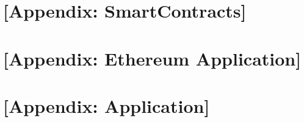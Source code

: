 

\setcounter{chapter}{0}
\renewcommand\thechapter{\Alph{chapter}}

\captionsetup[table]{list=no}
\captionsetup[figure]{list=no}

\begingroup
\renewcommand{\cleardoublepage}{}
\renewcommand{\clearpage}{}
\vspace*{-5em}

\chapter{[Appendix: SmartContracts]} \label{smartcontracts}
\label{ch:appendix}

\vspace*{-1em}

 


%


\chapter{[Appendix: Ethereum Application] } \label{ethapplication}
\label{ch:appendixb}

\vspace*{-1em}



 \label{Compilation}



\chapter{[Appendix: Application]}
\label{ch:appendixc}

\vspace*{-1em}


